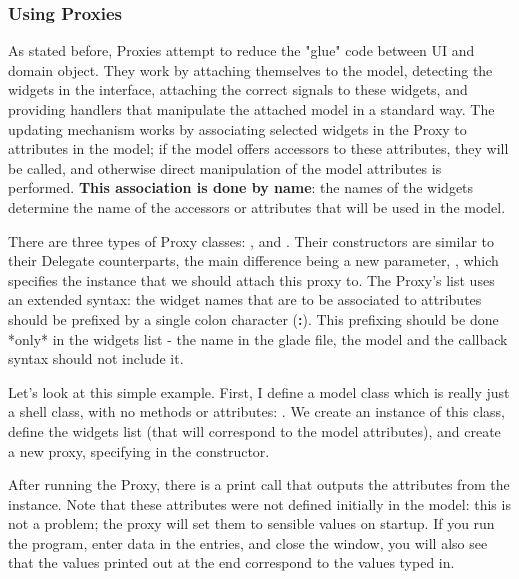 \documentclass[a4paper]{howto}
\begin{document}
\subsubsection{Using Proxies}

As stated before, Proxies attempt to reduce the "glue" code between UI
and domain object.  They work by attaching themselves to the model,
detecting the widgets in the interface, attaching the correct signals to
these widgets, and providing handlers that manipulate the attached model
in a standard way.  The updating mechanism works by associating selected
widgets in the Proxy to attributes in the model; if the model offers
accessors to these attributes, they will be called, and otherwise direct
manipulation of the model attributes is performed. {\bf This association
is done by name}: the names of the widgets determine the name of the
accessors or attributes that will be used in the model.

There are three types of Proxy classes: ,
 and . Their constructors are similar to
their Delegate counterparts, the main difference being a new parameter,
, which specifies the instance that we should attach this
proxy to. The Proxy's  list uses an extended syntax: the
widget names that are to be associated to attributes should be prefixed
by a single colon character ({\bf :}).  This prefixing should be done
*only* in the widgets list - the name in the glade file, the model and
the callback syntax should not include it.





Let's look at this simple example. First, I define a model class which
is really just a shell class, with no methods or attributes:
. We create an instance of this class, define the
widgets list (that will correspond to the model attributes), and create
a new proxy, specifying  in the constructor.

After running the Proxy, there is a print call that outputs the
attributes from the  instance. Note that these attributes
were not defined initially in the model: this is not a problem; the
proxy will set them to sensible values on startup. If you run the
program, enter data in the entries, and close the window, you will also
see that the values printed out at the end correspond to the values
typed in.
\end{document}
